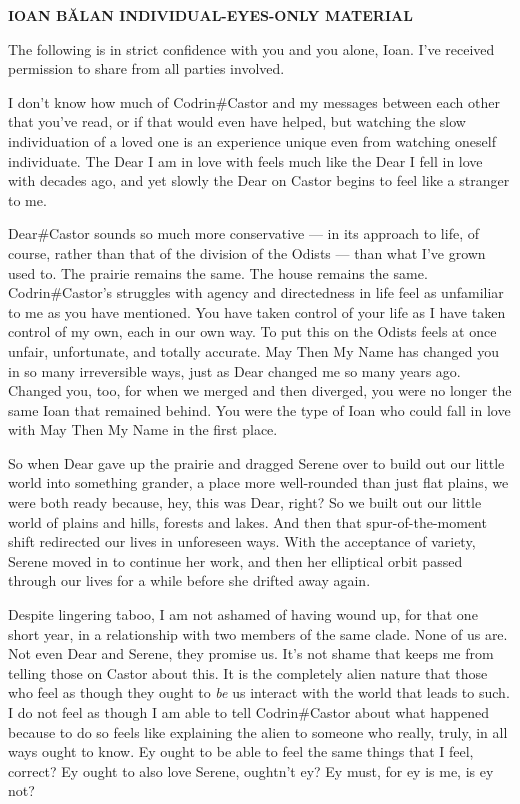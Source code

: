 \textbf{IOAN BĂLAN INDIVIDUAL-EYES-ONLY MATERIAL}

The following is in strict confidence with you and you alone, Ioan. I've received permission to share from all parties involved.

I don't know how much of Codrin\#Castor and my messages between each other that you've read, or if that would even have helped, but watching the slow individuation of a loved one is an experience unique even from watching oneself individuate. The Dear I am in love with feels much like the Dear I fell in love with decades ago, and yet slowly the Dear on Castor begins to feel like a stranger to me.

Dear\#Castor sounds so much more conservative — in its approach to life, of course, rather than that of the division of the Odists — than what I've grown used to. The prairie remains the same. The house remains the same. Codrin\#Castor's struggles with agency and directedness in life feel as unfamiliar to me as you have mentioned. You have taken control of your life as I have taken control of my own, each in our own way. To put this on the Odists feels at once unfair, unfortunate, and totally accurate. May Then My Name has changed you in so many irreversible ways, just as Dear changed me so many years ago. Changed you, too, for when we merged and then diverged, you were no longer the same Ioan that remained behind. You were the type of Ioan who could fall in love with May Then My Name in the first place.

So when Dear gave up the prairie and dragged Serene over to build out our little world into something grander, a place more well-rounded than just flat plains, we were both ready because, hey, this was Dear, right? So we built out our little world of plains and hills, forests and lakes. And then that spur-of-the-moment shift redirected our lives in unforeseen ways. With the acceptance of variety, Serene moved in to continue her work, and then her elliptical orbit passed through our lives for a while before she drifted away again.

Despite lingering taboo, I am not ashamed of having wound up, for that one short year, in a relationship with two members of the same clade. None of us are. Not even Dear and Serene, they promise us. It's not shame that keeps me from telling those on Castor about this. It is the completely alien nature that those who feel as though they ought to \emph{be} us interact with the world that leads to such. I do not feel as though I am able to tell Codrin\#Castor about what happened because to do so feels like explaining the alien to someone who really, truly, in all ways ought to know. Ey ought to be able to feel the same things that I feel, correct? Ey ought to also love Serene, oughtn't ey? Ey must, for ey is me, is ey not?

